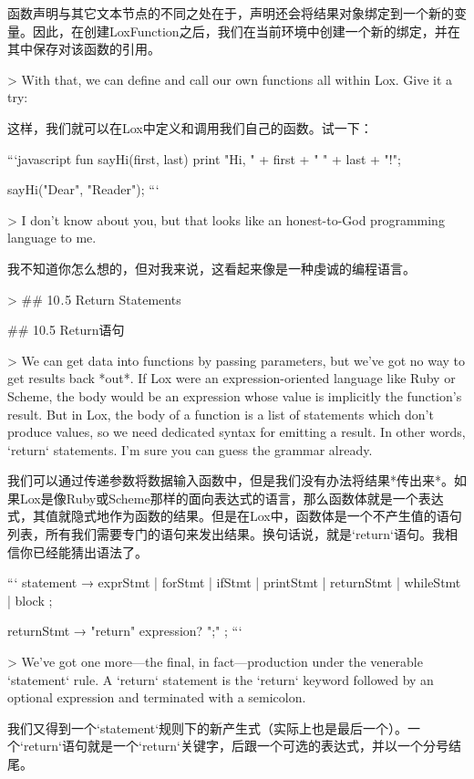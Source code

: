\documentclass[cn,11pt,chinese]{elegantbook}
\begin{document}
{{{{{{{{函数声明与其它文本节点的不同之处在于，声明还会将结果对象绑定到一个新的变量。因此，在创建LoxFunction之后，我们在当前环境中创建一个新的绑定，并在其中保存对该函数的引用。

> With that, we can define and call our own functions all within Lox. Give it a try:

这样，我们就可以在Lox中定义和调用我们自己的函数。试一下：

```javascript
fun sayHi(first, last) {
  print "Hi, " + first + " " + last + "!";
}

sayHi("Dear", "Reader");
```

> I don’t know about you, but that looks like an honest-to-God programming language to me.

我不知道你怎么想的，但对我来说，这看起来像是一种虔诚的编程语言。

> ## 10 . 5 Return Statements

## 10.5 Return语句

> We can get data into functions by passing parameters, but we’ve got no way to get results back *out*. If Lox were an expression-oriented language like Ruby or Scheme, the body would be an expression whose value is implicitly the function’s result. But in Lox, the body of a function is a list of statements which don’t produce values, so we need dedicated syntax for emitting a result. In other words, `return` statements. I’m sure you can guess the grammar already.

我们可以通过传递参数将数据输入函数中，但是我们没有办法将结果*传出来*。如果Lox是像Ruby或Scheme那样的面向表达式的语言，那么函数体就是一个表达式，其值就隐式地作为函数的结果。但是在Lox中，函数体是一个不产生值的语句列表，所有我们需要专门的语句来发出结果。换句话说，就是`return`语句。我相信你已经能猜出语法了。

```
statement      → exprStmt
               | forStmt
               | ifStmt
               | printStmt
               | returnStmt
               | whileStmt
               | block ;

returnStmt     → "return" expression? ";" ;
```

> We’ve got one more—the final, in fact—production under the venerable `statement` rule. A `return` statement is the `return` keyword followed by an optional expression and terminated with a semicolon.

我们又得到一个`statement`规则下的新产生式（实际上也是最后一个）。一个`return`语句就是一个`return`关键字，后跟一个可选的表达式，并以一个分号结尾。

}}}}}}}}
\end{document}
